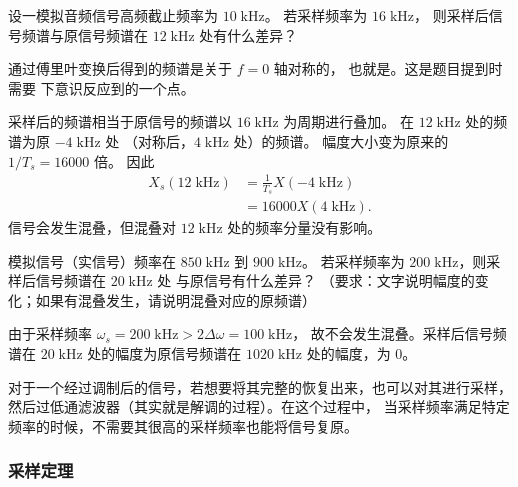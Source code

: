 \begin{example}
    设一模拟音频信号高频截止频率为 $10\;\mathrm{kHz}$。
    若采样频率为 $16\;\mathrm{kHz}$，
    则采样后信号频谱与原信号频谱在 $12\;\mathrm{kHz}$ 处有什么差异？
\end{example}

\begin{note}
    通过傅里叶变换后得到的频谱是关于 $f = 0$ 轴对称的，
    也就是。这是题目提到时需要
    下意识反应到的一个点。
\end{note}

\begin{solution}
    采样后的频谱相当于原信号的频谱以 $16\;\mathrm{kHz}$ 为周期进行叠加。
    在 $12\;\mathrm{kHz}$ 处的频谱为原 $-4\;\mathrm{kHz}$ 处
    （对称后，$4\;\mathrm{kHz}$ 处）的频谱。
    幅度大小变为原来的 $1/T_s = 16000$ 倍。
    因此
    \begin{align*}
        X_s(12\;\mathrm{kHz}) & = \frac{1}{T_s}X(-4\;\mathrm{kHz}) \\
        & = 16000X(4\;\mathrm{kHz}).
    \end{align*}
    信号会发生混叠，但混叠对 $12\;\mathrm{kHz}$ 处的频率分量没有影响。
\end{solution}

\begin{example}
    模拟信号（实信号）频率在 $850\;\mathrm{kHz}$ 到 $900\;\mathrm{kHz}$。
    若采样频率为 $200\;\mathrm{kHz}$，则采样后信号频谱在 $20\;\mathrm{kHz}$ 处
    与原信号有什么差异？
    （要求：文字说明幅度的变化；如果有混叠发生，请说明混叠对应的原频谱）
\end{example}

\begin{solution}
    由于采样频率 $\omega_s = 200\;\mathrm{kHz} > 2\Delta\omega = 100\;\mathrm{kHz}$，
    故不会发生混叠。采样后信号频谱在 $20\;\mathrm{kHz}$ 处的幅度为原信号频谱在
    $1020\;\mathrm{kHz}$ 处的幅度，为 $0$。
\end{solution}

\begin{remark}
    对于一个经过调制后的信号，若想要将其完整的恢复出来，也可以对其进行采样，
    然后过低通滤波器（其实就是解调的过程）。在这个过程中，
    当采样频率满足特定频率的时候，不需要其很高的采样频率也能将信号复原。
\end{remark}

\subsubsection{采样定理}

